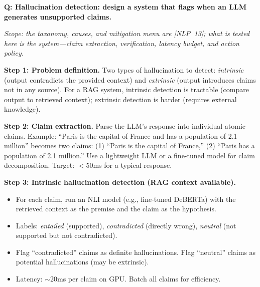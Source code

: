\begin{interviewq}
\textbf{Q: Hallucination detection: design a system that flags when an LLM generates unsupported claims.}

 \quad {} \quad \badgefreq{\freqmed}

\textit{Scope: the taxonomy, causes, and mitigation menu are [NLP~13]; what is
tested here is the system---claim extraction, verification, latency budget, and
action policy.}

\stronganswer

\textbf{Step 1: Problem definition.} Two types of hallucination to detect: \textit{intrinsic} (output contradicts the provided context) and \textit{extrinsic} (output introduces claims not in any source). For a RAG system, intrinsic detection is tractable (compare output to retrieved context); extrinsic detection is harder (requires external knowledge).

\textbf{Step 2: Claim extraction.} Parse the LLM's response into individual atomic claims. Example: ``Paris is the capital of France and has a population of 2.1 million'' becomes two claims: (1) ``Paris is the capital of France,'' (2) ``Paris has a population of 2.1 million.'' Use a lightweight LLM or a fine-tuned model for claim decomposition. Target: $<$50ms for a typical response.

\textbf{Step 3: Intrinsic hallucination detection (RAG context available).}
\begin{itemize}
    \item For each claim, run an NLI model (e.g., fine-tuned DeBERTa) with the retrieved context as the premise and the claim as the hypothesis.
    \item Labels: \textit{entailed} (supported), \textit{contradicted} (directly wrong), \textit{neutral} (not supported but not contradicted).
    \item Flag ``contradicted'' claims as definite hallucinations. Flag ``neutral'' claims as potential hallucinations (may be extrinsic).
    \item Latency: $\sim$20ms per claim on GPU. Batch all claims for efficiency.
\end{itemize}


\end{interviewq}

